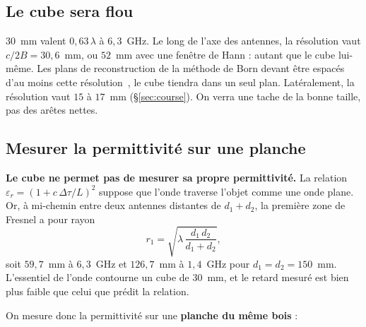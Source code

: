 \documentclass[11pt,a4paper]{article}
\newcommand{\eps}{\varepsilon_r}
\begin{document}
\subsection{Le cube sera flou}

$30$~mm valent $0{,}63\,\lambda$ à $6{,}3$~GHz. Le long de l'axe des antennes, la
résolution vaut $c/2B = 30{,}6$~mm, ou $52$~mm avec une fenêtre de Hann : autant
que le cube lui-même. Les plans de reconstruction de la méthode de Born devant
être espacés d'au moins cette résolution~\cite{amineh2011}, le cube tiendra dans
un seul plan. Latéralement, la résolution vaut $15$ à $17$~mm
(\S\ref{sec:course}). On verra une tache de la bonne taille, pas des arêtes
nettes.

\subsection{Mesurer la permittivité sur une planche}
\label{sec:mesure_eps}

\textbf{Le cube ne permet pas de mesurer sa propre permittivité.} La relation
$\eps = (1 + c\,\Delta\tau/L)^2$ suppose que l'onde traverse l'objet comme une
onde plane. Or, à mi-chemin entre deux antennes distantes de $d_1 + d_2$, la
première zone de Fresnel a pour rayon
\[
  r_1 = \sqrt{\lambda\,\frac{d_1\,d_2}{d_1 + d_2}},
\]
soit $59{,}7$~mm à $6{,}3$~GHz et $126{,}7$~mm à $1{,}4$~GHz pour
$d_1 = d_2 = 150$~mm. L'essentiel de l'onde contourne un cube de $30$~mm, et le
retard mesuré est bien plus faible que celui que prédit la relation.

On mesure donc la permittivité sur une \textbf{planche du même bois} :
\end{document}
